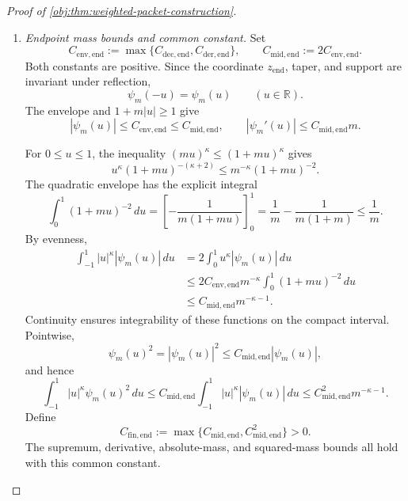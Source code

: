 \documentclass[11pt]{article}
\begin{document}
\begin{proof}[Proof of \cref{obj:thm:weighted-packet-construction}]
\begin{enumerate}
To obtain continuous differentiability on the whole line, define
\[
\mathcal T(u):=
\begin{cases}
(1-u^2)^4,&|u|\le1,\\
0,&|u|>1.
\end{cases}
\]
For every \(u\in\mathbb R\),
\[
\mathcal T(u)
=
\frac{(1-u^2)^4+(1-u^2)|1-u^2|^3}{2}.
\]
The function \(v\mapsto|v|^3\) is continuously differentiable, with derivative \(3v|v|\). Thus \(\mathcal T\) is continuously differentiable, and
\[
\psi_m(u)
=
\mathcal T(u)\frac{K_m(z_{\mathrm{end}}(u))}{K_m(-1)}
\qquad(u\in\mathbb R)
\]
is a product of continuously differentiable functions. Outside \([-1,1]\) the packet is locally zero, so
\[
\psi_m'(u)=0\qquad(|u|>1).
\]
Continuity of \(\psi_m'\) extends the derivative bound from the complement of
\(\{-1,0,1\}\) to all of \(\mathbb R\).

\item \emph{Endpoint mass bounds and common constant.}
Set
\[
C_{\mathrm{env,end}}
:=
\max\{C_{\mathrm{dec,end}},C_{\mathrm{der,end}}\},
\qquad
C_{\mathrm{mid,end}}:=2C_{\mathrm{env,end}}.
\]
Both constants are positive. Since the coordinate \(z_{\mathrm{end}}\), taper, and support are invariant under reflection,
\[
\psi_m(-u)=\psi_m(u)\qquad(u\in\mathbb R).
\]
The envelope and \(1+m|u|\ge1\) give
\[
|\psi_m(u)|\le C_{\mathrm{env,end}}\le C_{\mathrm{mid,end}},
\qquad
|\psi_m'(u)|\le C_{\mathrm{mid,end}}m.
\]

For \(0\le u\le1\), the inequality
\((mu)^\kappa\le(1+mu)^\kappa\) gives
\[
u^\kappa(1+mu)^{-(\kappa+2)}
\le m^{-\kappa}(1+mu)^{-2}.
\]
The quadratic envelope has the explicit integral
\[
\int_0^1(1+mu)^{-2}\,du
=
\left[-\frac1{m(1+mu)}\right]_0^1
=
\frac1m-\frac1{m(1+m)}
\le\frac1m.
\]
By evenness,
\[
\begin{split}
\int_{-1}^1|u|^\kappa|\psi_m(u)|\,du
&=
2\int_0^1u^\kappa|\psi_m(u)|\,du\\
&\le
2C_{\mathrm{env,end}}m^{-\kappa}
\int_0^1(1+mu)^{-2}\,du\\
&\le C_{\mathrm{mid,end}}m^{-\kappa-1}.
\end{split}
\]
Continuity ensures integrability of these functions on the compact interval. Pointwise,
\[
\psi_m(u)^2
=
|\psi_m(u)|^2
\le C_{\mathrm{mid,end}}|\psi_m(u)|,
\]
and hence
\[
\int_{-1}^1|u|^\kappa\psi_m(u)^2\,du
\le
C_{\mathrm{mid,end}}
\int_{-1}^1|u|^\kappa|\psi_m(u)|\,du
\le C_{\mathrm{mid,end}}^2m^{-\kappa-1}.
\]
Define
\[
C_{\mathrm{fin,end}}
:=
\max\{C_{\mathrm{mid,end}},C_{\mathrm{mid,end}}^2\}>0.
\]
The supremum, derivative, absolute-mass, and squared-mass bounds all hold with this common constant.


\end{enumerate}
\end{proof}
\end{document}
